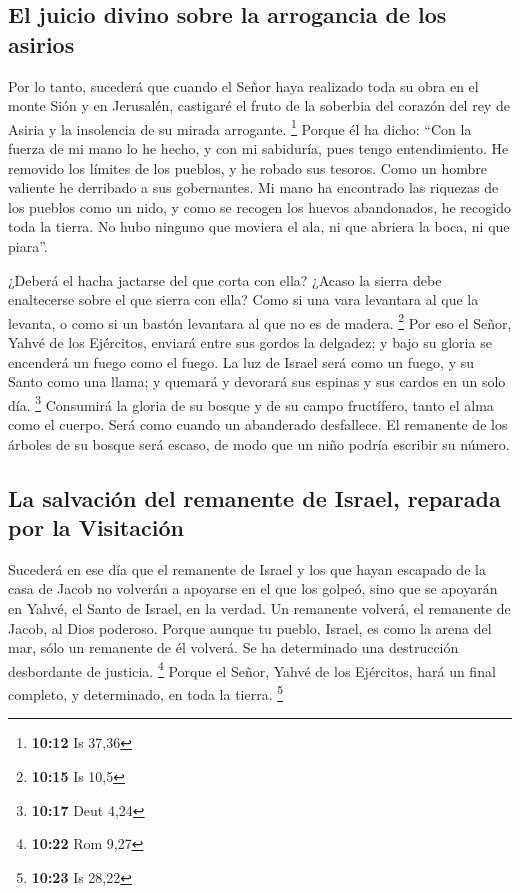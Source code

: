 \begin{paracol}{2}
\hypertarget{el-juicio-divino-sobre-la-arrogancia-de-los-asirios}{%
\subsection{El juicio divino sobre la arrogancia de los
asirios}\label{el-juicio-divino-sobre-la-arrogancia-de-los-asirios}}

 Por lo tanto, sucederá que cuando el Señor haya
realizado toda su obra en el monte Sión y en Jerusalén, castigaré el
fruto de la soberbia del corazón del rey de Asiria y la insolencia de su
mirada arrogante. \footnote{\textbf{10:12} Is 37,36} 
Porque él ha dicho: ``Con la fuerza de mi mano lo he hecho, y con mi
sabiduría, pues tengo entendimiento. He removido los límites de los
pueblos, y he robado sus tesoros. Como un hombre valiente he derribado a
sus gobernantes.  Mi mano ha encontrado las riquezas de
los pueblos como un nido, y como se recogen los huevos abandonados, he
recogido toda la tierra. No hubo ninguno que moviera el ala, ni que
abriera la boca, ni que piara''.

 ¿Deberá el hacha jactarse del que corta con ella? ¿Acaso
la sierra debe enaltecerse sobre el que sierra con ella? Como si una
vara levantara al que la levanta, o como si un bastón levantara al que
no es de madera. \footnote{\textbf{10:15} Is 10,5}  Por
eso el Señor, Yahvé de los Ejércitos, enviará entre sus gordos la
delgadez; y bajo su gloria se encenderá un fuego como el fuego.
 La luz de Israel será como un fuego, y su Santo como una
llama; y quemará y devorará sus espinas y sus cardos en un solo día.
\footnote{\textbf{10:17} Deut 4,24}  Consumirá la gloria
de su bosque y de su campo fructífero, tanto el alma como el cuerpo.
Será como cuando un abanderado desfallece.  El remanente
de los árboles de su bosque será escaso, de modo que un niño podría
escribir su número.

\hypertarget{la-salvaciuxf3n-del-remanente-de-israel-reparada-por-la-visitaciuxf3n}{%
\subsection{La salvación del remanente de Israel, reparada por la
Visitación}\label{la-salvaciuxf3n-del-remanente-de-israel-reparada-por-la-visitaciuxf3n}}

 Sucederá en ese día que el remanente de Israel y los que
hayan escapado de la casa de Jacob no volverán a apoyarse en el que los
golpeó, sino que se apoyarán en Yahvé, el Santo de Israel, en la verdad.
 Un remanente volverá, el remanente de Jacob, al Dios
poderoso.  Porque aunque tu pueblo, Israel, es como la
arena del mar, sólo un remanente de él volverá. Se ha determinado una
destrucción desbordante de justicia. \footnote{\textbf{10:22} Rom 9,27}
 Porque el Señor, Yahvé de los Ejércitos, hará un final
completo, y determinado, en toda la tierra. \footnote{\textbf{10:23} Is
  28,22}


\end{paracol}
